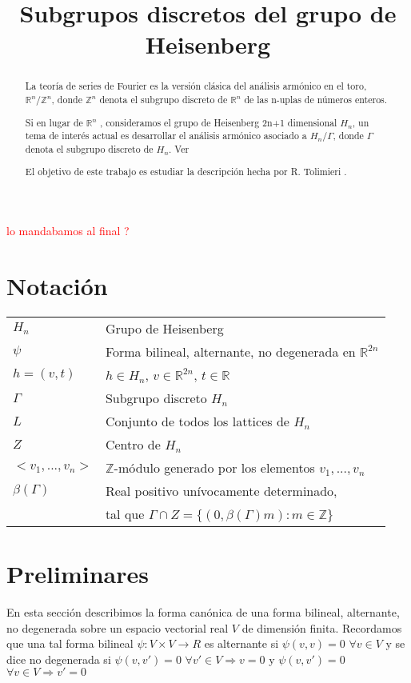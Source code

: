 \documentclass[12pt]{article}
\title{Subgrupos discretos del grupo de Heisenberg }
\date{}
\begin{document}
\maketitle

\begin{abstract}
La teoría de series de Fourier es la versión clásica del análisis armónico en el toro,
$\mathbb{R}^n /\mathbb{Z}^n$, donde $\mathbb{Z}^n$ denota el subgrupo discreto de $\mathbb{R}^n$ de
las n-uplas de números enteros.

Si en lugar de $\mathbb{R}^n$ , consideramos el grupo de Heisenberg 2n+1 dimensional $H_n$, un tema
de interés actual es desarrollar el análisis armónico asociado a $H_n/\Gamma$, donde $\Gamma$ 
denota el subgrupo discreto de $H_n$. Ver \cite{Th} 

El objetivo de este trabajo es estudiar la descripción hecha por R. Tolimieri \cite{To}.

\end{abstract}

\textcolor{red}{lo mandabamos al final ?}
\section{Notación}
\begin{tabular}{ l l }
  $H_n$ & Grupo de Heisenberg \\
  $\psi$ & Forma bilineal, alternante, no degenerada  en $\mathbb{R}^{2n}$ \\
  $h=(v,t)$ & $h \in H_n$, $v \in \mathbb{R}^{2n}$, $t \in \mathbb{R}$ \\
  $\Gamma$ & Subgrupo discreto $H_n$ \\
  $L$ & Conjunto de todos los lattices de $H_n$ \\
  $Z$ & Centro de $H_n$ \\
  $<v_1,...,v_n>$ & $\mathbb{Z}$-módulo generado por los elementos $v_1,...,v_n$\\
  $\beta(\Gamma)$ & Real positivo unívocamente determinado,\\  
  & tal que $\Gamma \cap Z =\{(0,\beta(\Gamma) m): m\in \mathbb{Z} \}$ \\
\end{tabular}


 

\section{Preliminares}
En esta sección describimos la forma canónica de una forma bilineal,
alternante, no degenerada sobre un espacio vectorial real $V$ de dimensión finita. 
Recordamos que una tal forma bilineal $\psi :V\times V\rightarrow R$
es alternante si $\psi(v,v)=0$ $\forall v \in V$  y se dice no degenerada si 
$\psi(v,v')=0$ $\forall v' \in V \Rightarrow v = 0$  y 
$\psi(v,v')=0$ $\forall v \in V \Rightarrow v' = 0$
\end{document}
